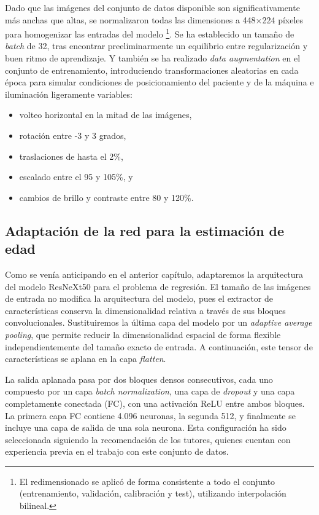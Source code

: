 Dado que las imágenes del conjunto de datos disponible son significativamente más anchas que altas, se 
normalizaron todas las dimensiones a 448×224 píxeles para homogenizar las entradas del modelo
\footnote{
El redimensionado se aplicó de forma consistente a todo el conjunto (entrenamiento, validación, calibración y 
test), utilizando interpolación bilineal.
}.
Se ha establecido un tamaño de \textit{batch} de 32, tras encontrar preeliminarmente un equilibrio entre 
regularización y buen ritmo de aprendizaje. 
Y también se ha realizado \textit{data augmentation} en el conjunto de entrenamiento, introduciendo 
transformaciones aleatorias en cada época para simular condiciones de posicionamiento del paciente y de la 
máquina e iluminación ligeramente variables: 
\begin{itemize}
    \item volteo horizontal en la mitad de las imágenes,
    \item rotación entre -3 y 3 grados,
    \item traslaciones de hasta el 2\%,
    \item escalado entre el 95 y 105\%, y
    \item cambios de brillo y contraste entre 80 y 120\%. 
\end{itemize}


\subsection{Adaptación de la red para la estimación de edad}

Como se venía anticipando en el anterior capítulo, adaptaremos la arquitectura del modelo ResNeXt50 para el 
problema de regresión. El tamaño de las imágenes de entrada no modifica la arquitectura del modelo, pues el 
extractor de características conserva la dimensionalidad relativa a través de sus bloques convolucionales.
Sustituiremos la última capa del modelo por un \textit{adaptive average pooling}, que permite reducir la 
dimensionalidad espacial de forma flexible independientemente del tamaño exacto de entrada. A continuación, 
este tensor de características se aplana en la capa \textit{flatten}.

La salida aplanada pasa por dos bloques densos consecutivos, cada uno compuesto por un capa 
\textit{batch normalization}, una capa de \textit{dropout} y una capa completamente conectada (FC), 
con una activación ReLU entre ambos bloques. La primera capa FC contiene 4.096 neuronas, la segunda 512, y 
finalmente se incluye una capa de salida de una sola neurona. 
Esta configuración ha sido seleccionada siguiendo la recomendación de los tutores, quienes cuentan con 
experiencia previa en el trabajo con este conjunto de datos.

